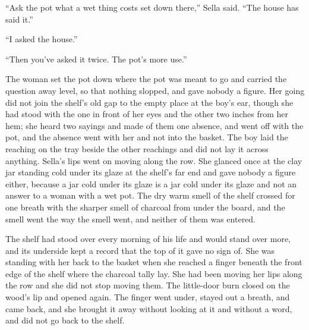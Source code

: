 “Ask the pot what a wet thing costs set down there,” Sella said. “The house has said it.”

“I asked the house.”

“Then you've asked it twice. The pot's more use.”

The woman set the pot down where the pot was meant to go and carried the question away level, so that nothing slopped, and gave nobody a figure. Her going did not join the shelf's old gap to the empty place at the boy's ear, though she had stood with the one in front of her eyes and the other two inches from her hem; she heard two sayings and made of them one absence, and went off with the pot, and the absence went with her and not into the basket. The boy laid the reaching on the tray beside the other reachings and did not lay it across anything. Sella's lips went on moving along the row. She glanced once at the clay jar standing cold under its glaze at the shelf's far end and gave nobody a figure either, because a jar cold under its glaze is a jar cold under its glaze and not an answer to a woman with a wet pot. The dry warm smell of the shelf crossed for one breath with the sharper smell of charcoal from under the board, and the smell went the way the smell went, and neither of them was entered.

The shelf had stood over every morning of his life and would stand over more, and its underside kept a record that the top of it gave no sign of. She was standing with her back to the basket when she reached a finger beneath the front edge of the shelf where the charcoal tally lay. She had been moving her lips along the row and she did not stop moving them. The little-door burn closed on the wood's lip and opened again. The finger went under, stayed out a breath, and came back, and she brought it away without looking at it and without a word, and did not go back to the shelf.

